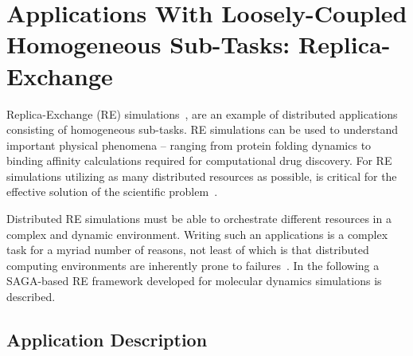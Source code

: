 \documentclass{llncs}
\begin{document}
\section{Applications With Loosely-Coupled Homogeneous
  Sub-Tasks: Replica-Exchange}  
\up {}
  

Replica-Exchange (RE) simulations~\cite{Sugita:1999rm},
are an example of distributed applications consisting of homogeneous
sub-tasks. RE simulations can be used to understand important physical
phenomena -- ranging from protein folding dynamics to binding affinity
calculations required for computational drug discovery.  For RE
simulations utilizing as many distributed resources as possible, is
critical for the effective solution of the scientific
problem~\cite{repex_ptrsa}.

Distributed RE simulations must be able to orchestrate different
resources in a complex and dynamic environment.  Writing such an
applications is a complex task for a myriad number of reasons, not
least of which is that distributed computing environments are
inherently prone to failures~\cite{Luckow:2008la}. In the following a
SAGA-based RE framework developed for molecular dynamics simulations
is described.

\up

\subsection{Application Description}

\up

\end{document}
